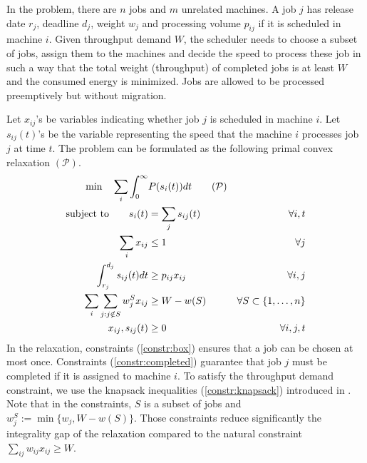 \documentclass[11pt,a4paper]{article}
\begin{document}
In the problem, there are $n$ jobs and $m$ unrelated machines. 
A job $j$ has release date $r_{j}$, deadline $d_{j}$,
weight $w_{j}$ and processing volume $p_{ij}$ if it is scheduled in machine $i$. 
Given throughput demand $W$, the scheduler needs to choose a 
subset of jobs, assign them to the machines and decide the speed 
to process these job in such a way that the total weight (throughput) of completed 
jobs is at least $W$ and the consumed energy is minimized. 
Jobs are allowed to be processed preemptively but without migration.   



Let $x_{ij}$'s be variables indicating whether job $j$ 
is scheduled in machine $i$. 
Let $s_{ij}(t)$'s be the variable representing the speed
that the machine $i$ processes job $j$ at time $t$.  
The problem can be formulated as the following primal convex relaxation $(\mathcal{P})$.
\begin{alignat}{3}
    \text{min} \quad \sum_{i} \int_{0}^{\infty} & P(s_{i}(t)) dt 	 \tag{$\mathcal{P}$}  \\
\text{subject to} 	\qquad s_{i}(t) &= \sum_{j} s_{ij}(t)	\qquad &\forall i, t \notag \\
					     \sum_{i} x_{ij} &\leq 1 \qquad &\forall j 	\label{constr:box} \\
					     \int_{r_{j}}^{d_{j}} s_{ij}(t)dt & \geq p_{ij}x_{ij}   \qquad &\forall i, j 		\label{constr:completed} \\
					     \sum_{i} \sum_{j: j\notin S} w^{S}_{j}x_{ij} &\geq W - w(S) &\forall S \subset \{1,\ldots,n\} 	\label{constr:knapsack}	\\
					     x_{ij},  s_{ij}(t) &\geq 0 \qquad &\forall i, j, t \notag
  \end{alignat}
In the relaxation, constraints (\ref{constr:box}) ensures that a job can be chosen at most once.
Constraints (\ref{constr:completed}) guarantee that job $j$ must be completed if it is assigned to 
machine $i$. To satisfy the throughput demand constraint, we use the knapsack inequalities (\ref{constr:knapsack}) 
introduced in \cite{CarrFleischer00:Strengthening-integrality}. 
Note that in the constraints,  $S$ is a subset of jobs and $w^{S}_{j} := \min\{w_{j}, W - w(S)\}$.
Those constraints reduce significantly the integrality gap of the relaxation 
compared to the natural constraint $\sum_{ij} w_{ij}x_{ij} \geq W$.
\end{document}

